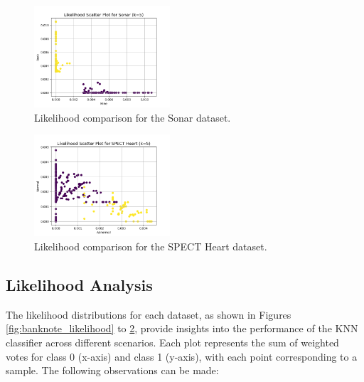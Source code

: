 \documentclass[conference]{IEEEtran}
\begin{document}
\begin{figure}[H]
    \centering
    \includegraphics[width=0.45\textwidth]{../scripts/comparison_results/Sonar_likelihood.png}
    \caption{Likelihood comparison for the Sonar dataset.}
    \label{fig:sonar_likelihood}
\end{figure}

\begin{figure}[H]
    \centering
    \includegraphics[width=0.45\textwidth]{../scripts/comparison_results/SPECT Heart_likelihood.png}
    \caption{Likelihood comparison for the SPECT Heart dataset.}
    \label{fig:spect_heart_likelihood}
\end{figure}

\subsection{Likelihood Analysis}

The likelihood distributions for each dataset, as shown in Figures \ref{fig:banknote_likelihood} to \ref{fig:spect_heart_likelihood}, provide insights into the performance of the KNN classifier across different scenarios. Each plot represents the sum of weighted votes for class 0 (x-axis) and class 1 (y-axis), with each point corresponding to a sample. The following observations can be made:
\end{document}
